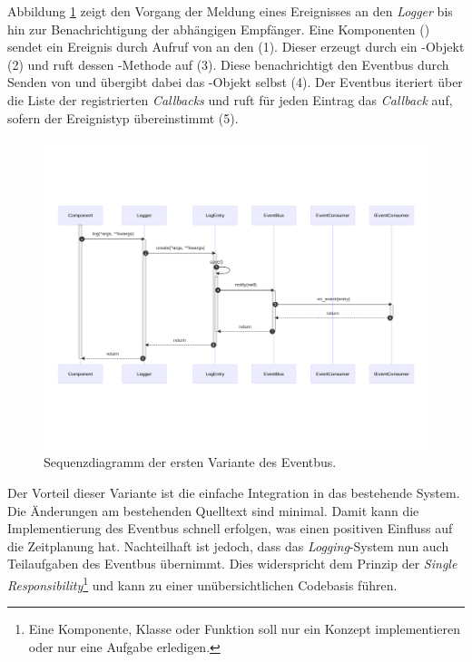 Abbildung \ref{fig:eventbus-v1-seq} zeigt den Vorgang der Meldung eines Ereignisses an den \emph{Logger} bis hin zur Benachrichtigung der abhängigen Empfänger. Eine Komponenten () sendet ein Ereignis durch Aufruf von  an den  (1). Dieser erzeugt durch  ein -Objekt (2) und ruft dessen -Methode auf (3). Diese benachrichtigt den Eventbus durch Senden von  und übergibt dabei das -Objekt selbst (4). Der Eventbus iteriert über die Liste der registrierten \emph{Callbacks} und ruft für jeden Eintrag das \emph{Callback} auf, sofern der Ereignistyp übereinstimmt (5).\\

\begin{figure}[htb]
	\centering
	\includegraphics[width=1.0\linewidth]{images/diagrams/eventbus-v1-seq.png}
	\caption{Sequenzdiagramm der ersten Variante des Eventbus.}
	\label{fig:eventbus-v1-seq}
\end{figure}

Der Vorteil dieser Variante ist die einfache Integration in das bestehende System. Die Änderungen am bestehenden Quelltext sind minimal. Damit kann die Implementierung des Eventbus schnell erfolgen, was einen positiven Einfluss auf die Zeitplanung hat. Nachteilhaft ist jedoch, dass das \emph{Logging}-System nun auch Teilaufgaben des Eventbus übernimmt. Dies widerspricht dem Prinzip der \emph{Single Responsibility}\footnote{Eine Komponente, Klasse oder Funktion soll nur ein Konzept implementieren oder nur eine Aufgabe erledigen.} und kann zu einer unübersichtlichen Codebasis führen.

